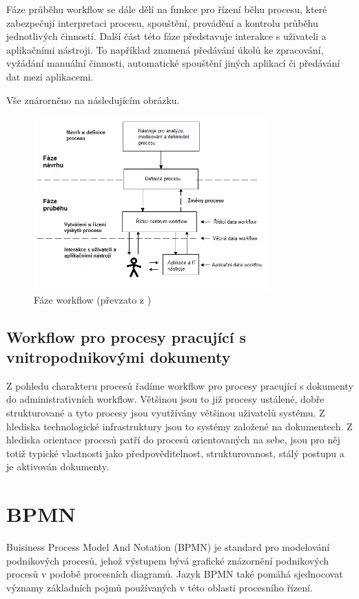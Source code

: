 \documentclass{fithesis}
\begin{document}
Fáze průběhu workflow se dále dělí na funkce pro řízení běhu procesu, které zabezpečují interpretaci procesu, spouštění, provádění a kontrolu průběhu jednotlivých činností. Další část této fáze představuje interakce s uživateli a aplikačními nástroji. To například znamená předávání úkolů ke zpracování, vyžádání manuální činnosti, automatické spouštění jiných aplikací či předávání dat mezi aplikacemi.

Vše znárorněno na následujícím obrázku.

\begin{figure}[htp]
\centering
\includegraphics[width=340px]{images/faze_workflow.png}
\caption{Fáze workflow (převzato z \cite{wfmc})}
\end{figure}

\section{Workflow pro procesy pracující s vnitropodnikovými dokumenty}

Z pohledu charakteru procesů řadíme workflow pro procesy pracující s dokumenty do administrativních workflow. Většinou jsou to již procesy ustálené, dobře strukturované a tyto procesy jsou vyutžívány většinou uživatelů systému. Z hlediska technologické infrastruktury jsou to systémy založené na dokumentech. Z hlediska orientace procesů patří do procesů orientovaných na sebe, jsou pro něj totiž typické vlastnosti jako předpověditelnost, strukturovanost, stálý postupu a je aktivován dokumenty.






\chapter{BPMN}
Buisiness Process Model And Notation (BPMN) je standard pro modelování podnikových procesů, jehož výstupem bývá grafické znázornění podnikových procesů v podobě procesních diagramů. \cite{bpmn} Jazyk BPMN také pomáhá sjednocovat významy základních pojmů používaných v této oblasti procesního řízení. 
\end{document}
